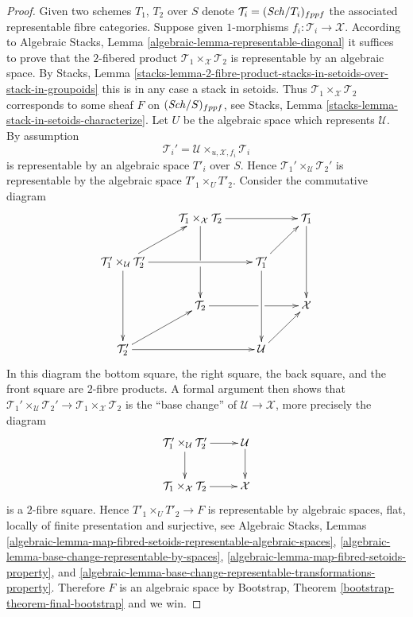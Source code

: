 \begin{proof}
Given two schemes $T_1$, $T_2$ over $S$ denote
$\mathcal{T}_i = (\mathit{Sch}/T_i)_{fppf}$ the associated representable
fibre categories. Suppose given $1$-morphisms
$f_i : \mathcal{T}_i \to \mathcal{X}$.
According to
Algebraic Stacks, Lemma \ref{algebraic-lemma-representable-diagonal}
it suffices to prove that the $2$-fibered
product $\mathcal{T}_1 \times_\mathcal{X} \mathcal{T}_2$
is representable by an algebraic space. By
Stacks, Lemma
\ref{stacks-lemma-2-fibre-product-stacks-in-setoids-over-stack-in-groupoids}
this is in any case a stack in setoids. Thus
$\mathcal{T}_1 \times_\mathcal{X} \mathcal{T}_2$ corresponds
to some sheaf $F$ on $(\mathit{Sch}/S)_{fppf}$, see
Stacks, Lemma \ref{stacks-lemma-stack-in-setoids-characterize}.
Let $U$ be the algebraic space which represents $\mathcal{U}$.
By assumption
$$
\mathcal{T}_i' = \mathcal{U} \times_{u, \mathcal{X}, f_i} \mathcal{T}_i
$$
is representable by an algebraic space $T'_i$ over $S$. Hence
$\mathcal{T}_1' \times_\mathcal{U} \mathcal{T}_2'$ is representable
by the algebraic space $T'_1 \times_U T'_2$.
Consider the commutative diagram
$$
\xymatrix{
&
\mathcal{T}_1 \times_{\mathcal X} \mathcal{T}_2 \ar[rr]\ar'[d][dd] & &
\mathcal{T}_1 \ar[dd] \\
\mathcal{T}_1' \times_\mathcal{U} \mathcal{T}_2' \ar[ur]\ar[rr]\ar[dd] & &
\mathcal{T}_1' \ar[ur]\ar[dd] \\
&
\mathcal{T}_2 \ar'[r][rr] & &
\mathcal X \\
\mathcal{T}_2' \ar[rr]\ar[ur] & &
\mathcal{U} \ar[ur] }
$$
In this diagram the bottom square, the right square, the back square, and
the front square are $2$-fibre products. A formal argument then shows
that $\mathcal{T}_1' \times_\mathcal{U} \mathcal{T}_2' \to
\mathcal{T}_1 \times_{\mathcal X} \mathcal{T}_2$
is the ``base change'' of $\mathcal{U} \to \mathcal{X}$, more precisely
the diagram
$$
\xymatrix{
\mathcal{T}_1' \times_\mathcal{U} \mathcal{T}_2' \ar[d] \ar[r] &
\mathcal{U} \ar[d] \\
\mathcal{T}_1 \times_{\mathcal X} \mathcal{T}_2 \ar[r] &
\mathcal{X}
}
$$
is a $2$-fibre square.
Hence $T'_1 \times_U T'_2 \to F$ is representable by algebraic spaces,
flat, locally of finite presentation and surjective, see
Algebraic Stacks, Lemmas
\ref{algebraic-lemma-map-fibred-setoids-representable-algebraic-spaces},
\ref{algebraic-lemma-base-change-representable-by-spaces},
\ref{algebraic-lemma-map-fibred-setoids-property}, and
\ref{algebraic-lemma-base-change-representable-transformations-property}.
Therefore $F$ is an algebraic space by
Bootstrap, Theorem \ref{bootstrap-theorem-final-bootstrap}
and we win.
\end{proof}

